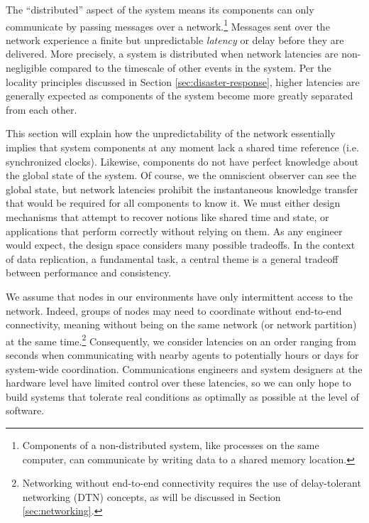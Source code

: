 \documentclass[]             %
{NASA}                       %
\theoremstyle{definition}
\begin{document}
The ``distributed'' aspect of the system means its components can only
communicate by passing messages over a network.\footnote{Components of
  a non-distributed system, like processes on the same computer, can
  communicate by writing data to a shared memory location.} Messages
sent over the network experience a finite but unpredictable
\emph{latency} or delay before they are delivered. More precisely, a
system is distributed when network latencies are non-negligible
compared to the timescale of other events in the system. Per the
locality principles discussed in Section \ref{sec:disaster-response},
higher latencies are generally expected as components of the system
become more greatly separated from each other.

This section will explain how the unpredictability of the network
essentially implies that system components at any moment lack a shared
time reference (i.e. synchronized clocks). Likewise, components do not
have perfect knowledge about the global state of the system. Of
course, we the omniscient observer can see the global state, but
network latencies prohibit the instantaneous knowledge transfer that
would be required for all components to know it. We must either design
mechanisms that attempt to recover notions like shared time and state,
or applications that perform correctly without relying on them. As any
engineer would expect, the design space considers many possible
tradeoffs. In the context of data replication, a fundamental task, a
central theme is a general tradeoff between performance and
consistency.

We assume that nodes in our environments have only intermittent access
to the network. Indeed, groups of nodes may need to coordinate without
end-to-end connectivity, meaning without being on the same network (or
network partition) at the same time.\footnote{Networking without
  end-to-end connectivity requires the use of delay-tolerant
  networking (DTN) concepts, as will be discussed in Section
  \ref{sec:networking}.}  Consequently, we consider latencies on an
order ranging from seconds when communicating with nearby agents to
potentially hours or days for system-wide coordination.
Communications engineers and system designers at the hardware level
have limited control over these latencies, so we can only hope to
build systems that tolerate real conditions as optimally as possible
at the level of software.
\end{document}
